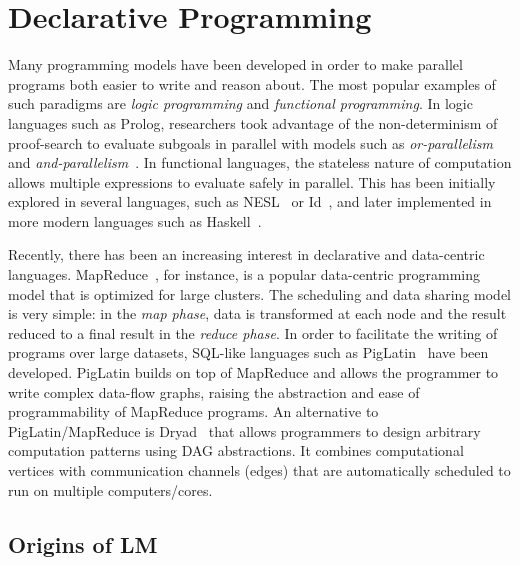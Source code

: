 \section{Declarative Programming}

Many programming models have been developed in order to make parallel programs
both easier to write and reason about. The most popular examples of such
paradigms are \emph{logic programming} and \emph{functional programming}.  In
logic languages such as Prolog, researchers took advantage of the
non-determinism of proof-search to evaluate subgoals in parallel with models
such as \emph{or-parallelism} and
\emph{and-parallelism}~\cite{Gupta:2001:PEP:504083.504085}.  In functional
languages, the stateless nature of computation allows multiple expressions to
evaluate safely in parallel.  This has been initially explored in several
languages, such as NESL~\cite{Blelloch:1996:PPA:227234.227246} or
Id~\cite{Nikhil93anoverview}, and later implemented in more modern languages
such as Haskell~\cite{Chakravarty07dataparallel}.

Recently, there has been an increasing interest in declarative and data-centric
languages. MapReduce~\cite{Dean:2008:MSD:1327452.1327492}, for instance, is a
popular data-centric programming model that is optimized for large clusters. The
scheduling and data sharing model is very simple: in the \emph{map phase}, data
is transformed at each node and the result reduced to a final result in the
\emph{reduce phase}. In order to facilitate the writing of programs over large
datasets, SQL-like languages such as
PigLatin~\cite{Olston:2008:PLN:1376616.1376726} have been developed. PigLatin
builds on top of MapReduce and allows the programmer to write complex data-flow
graphs, raising the abstraction and ease of programmability of MapReduce
programs. An alternative to PigLatin/MapReduce is
Dryad~\cite{Isard:2007:DDD:1272996.1273005} that allows programmers to design
arbitrary computation patterns using DAG abstractions. It combines computational
vertices with communication channels (edges) that are automatically scheduled to
run on multiple computers/cores.

\subsection{Origins of LM}

